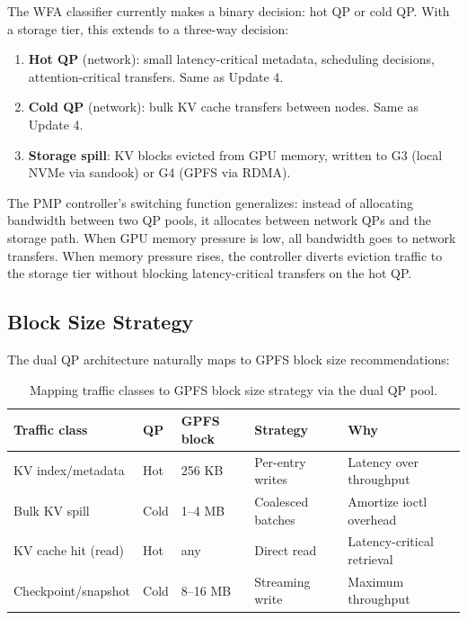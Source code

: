 \documentclass[11pt,letterpaper]{article}
\begin{document}
The WFA classifier currently makes a binary decision: hot QP or cold QP. With a storage tier, this extends to a three-way decision:

\begin{enumerate}
\item \textbf{Hot QP} (network): small latency-critical metadata, scheduling decisions, attention-critical transfers. Same as Update 4.
\item \textbf{Cold QP} (network): bulk KV cache transfers between nodes. Same as Update 4.
\item \textbf{Storage spill}: KV blocks evicted from GPU memory, written to G3 (local NVMe via sandook) or G4 (GPFS via RDMA).
\end{enumerate}

The PMP controller's switching function generalizes: instead of allocating bandwidth between two QP pools, it allocates between network QPs and the storage path. When GPU memory pressure is low, all bandwidth goes to network transfers. When memory pressure rises, the controller diverts eviction traffic to the storage tier without blocking latency-critical transfers on the hot QP.

\subsection{Block Size Strategy}

The dual QP architecture naturally maps to GPFS block size recommendations:

\begin{table}[ht]
\centering\small
\begin{tabular}{lllll}
\toprule
\textbf{Traffic class} & \textbf{QP} & \textbf{GPFS block} & \textbf{Strategy} & \textbf{Why} \\
\midrule
KV index/metadata & Hot & 256 KB & Per-entry writes & Latency over throughput \\
Bulk KV spill & Cold & 1--4 MB & Coalesced batches & Amortize ioctl overhead \\
KV cache hit (read) & Hot & any & Direct read & Latency-critical retrieval \\
Checkpoint/snapshot & Cold & 8--16 MB & Streaming write & Maximum throughput \\
\bottomrule
\end{tabular}
\caption{Mapping traffic classes to GPFS block size strategy via the dual QP pool.}
\label{tab:storage_mapping}
\end{table}
\end{document}
